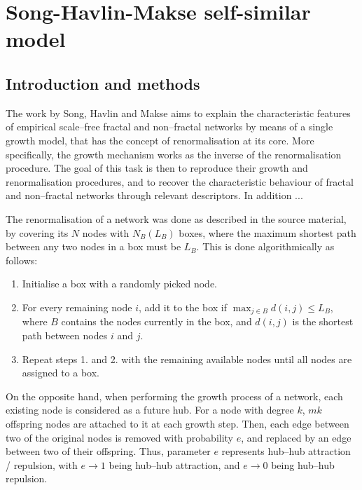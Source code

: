 \chapter{Song-Havlin-Makse self-similar model}


\section{Introduction and methods}
 
The work by Song, Havlin and Makse \cite{song2006origins} aims to explain the characteristic features of empirical scale--free fractal and non--fractal networks by means of a single growth model, that has the concept of renormalisation at its core. More specifically, the growth mechanism works as the inverse of the renormalisation procedure. The goal of this task is then to reproduce their growth and renormalisation procedures, and to recover the characteristic behaviour of fractal and non--fractal networks through relevant descriptors. In addition ...

The renormalisation of a network was done as described in the source material, by covering its $N$ nodes with $N_B(L_B)$ boxes, where the maximum shortest path between any two nodes in a box must be $L_B$. This is done algorithmically as follows:

\begin{enumerate}
	\item Initialise a box with a randomly picked node.
	\item For every remaining node $i$, add it to the box if $\max_{j\in B} d(i,j) \leq L_B$, where $B$ contains the nodes currently in the box, and $d(i,j)$ is the shortest path between nodes $i$ and $j$.
	\item Repeat steps 1. and 2. with the remaining available nodes until all nodes are assigned to a box.
\end{enumerate}

On the opposite hand, when performing the growth process of a network, each existing node is considered as a future hub. For a node with degree $k$, $mk$ offspring nodes are attached to it at each growth step. Then, each edge between two of the original nodes is removed with probability $e$, and replaced by an edge between two of their offspring. Thus, parameter $e$ represents hub--hub attraction / repulsion, with $e\rightarrow1$ being hub--hub attraction, and $e\rightarrow0$ being hub--hub repulsion.

